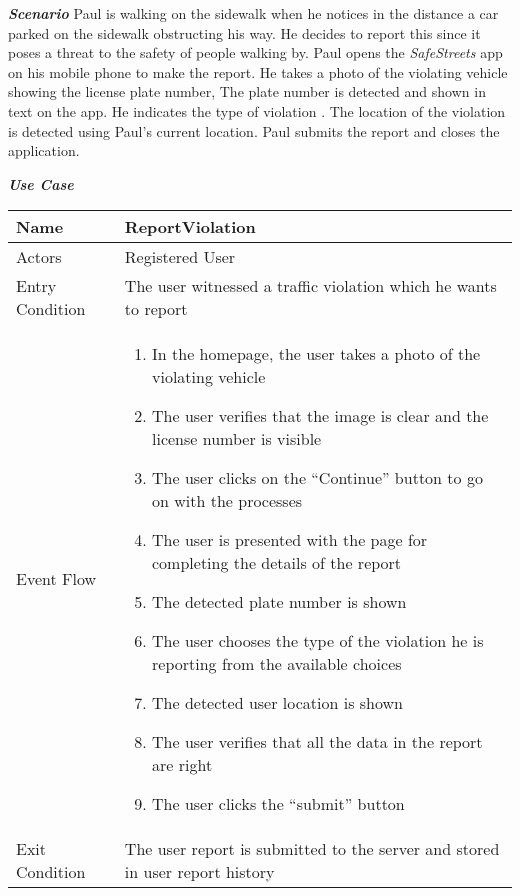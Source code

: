 \emph{\textbf{Scenario}}
Paul is walking on the sidewalk when he notices in the distance a car parked on the sidewalk obstructing his way. He decides to report this since it poses a threat to the safety of people walking by. Paul opens the \emph{SafeStreets} app on his mobile phone to make the report. He takes a photo of the violating vehicle showing the license plate number, The plate number is detected and shown in text on the app. He indicates the type of violation . The location of the violation is detected using Paul's current location. Paul submits the report and closes the application.


\begin{table}[H]
\begin{flushleft}\emph{\textbf{Use Case}}\end{flushleft}
\footnotesize
\centering
\settowidth{}
\setlength\extrarowheight{2pt}
\begin{tabulary}{\textwidth}{|J|J|}
\hline
Name            & ReportViolation \\
\hline
Actors          & Registered User \\
\hline
Entry Condition & The user witnessed a traffic violation which he wants to report \\
\hline
Event Flow      & 
\begin{minipage}[t]{0.7\textwidth}
\begin{enumerate} 
\item In the homepage, the user takes a photo of the violating vehicle
\item The user verifies that the image is clear and the license number is visible
\item The user clicks on the “Continue” button to go on with the processes
\item The user is presented with the page for completing the details of the report
\item The detected plate number is shown
\item The user chooses the type of the violation he is reporting from the available choices
\item The detected user location is shown
\item The user verifies that all the data in the report are right
\item The user clicks the “submit” button
\end{enumerate}
\end{minipage}\\
\hline
Exit Condition  & The user report is submitted to the server and stored in user report history \\

\end{tabulary}
\end{table}
